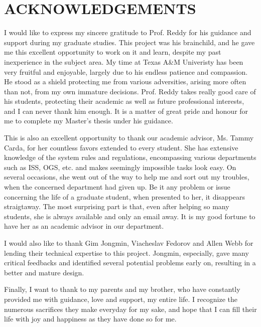 %
%
%


\chapter*{ACKNOWLEDGEMENTS}


\indent 

I would like to express my sincere gratitude to Prof. Reddy for his guidance and support during my graduate studies. 
This project was his brainchild, and he gave me this excellent opportunity to work on it and learn, despite my past inexperience in the subject area.
My time at Texas A\&M Univeristy has been very fruitful and enjoyable, largely due to his endless patience and compassion.
He stood as a shield protecting me from various adversities, arising more often than not, from my own immature decisions.
Prof. Reddy takes really good care of his students, protecting their academic as well as future professional interests, and I can never thank him enough. 
It is a matter of great pride and honour for me to complete my Master's thesis under his guidance.

This is also an excellent opportunity to thank our academic advisor, Ms. Tammy Carda, for her countless favors extended to every student.
She has extensive knowledge of the system rules and regulations, encompassing various departments such as ISS, OGS, etc. and makes seemingly impossible tasks look easy.
On several occasions, she went out of the way to help me and sort out my troubles, when the concerned department had given up.
Be it any problem or issue concerning the life of a graduate student, when presented to her, it disappears straigtaway.
The most surprising part is that, even after helping so many students, she is always available and only an email away.
It is my good fortune to have her as an academic advisor in our department.

I would also like to thank Gim Jongmin, Viacheslav Fedorov and Allen Webb for lending their technical expertise to this project. Jongmin, especially, gave many critical feedbacks and identified several potential problems early on, resulting in a better and mature design. 

Finally, I want to thank to my parents and my brother, who have constantly provided me with guidance, love and support, my entire life. I recognize the numerous sacrifices they make everyday for my sake, and hope that I can fill their life with joy and happiness as they have done so for me.

\pagebreak{}
